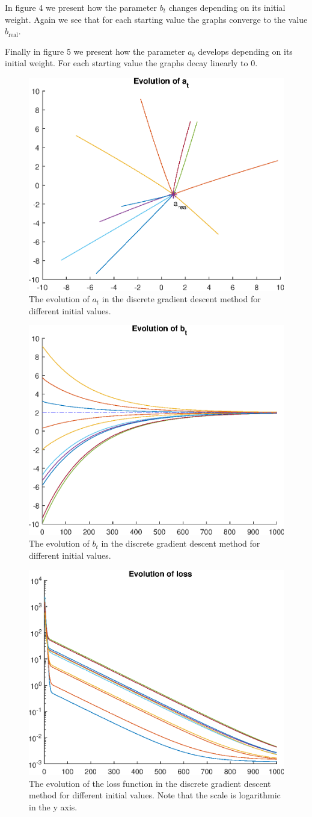 In figure 4 we
present how the parameter $ b_t $ changes depending
on its initial weight. Again we
see that for each starting value the graphs 
converge to the value $ b_{\mathrm{real}} $. \smallskip

Finally in figure 5 we
present how the parameter $ a_b $ develops depending
on its initial weight. For each starting value the graphs 
decay linearly to $ 0 $.

\begin{figure}[H]
	\centering
	\includegraphics[width=0.5\linewidth]{EvolutionA}
	\caption{The evolution of $ a_t $ in the
	discrete gradient descent method for different
	initial values.}\label{fig:exampleA}
\end{figure}

\begin{figure}[H]
	\centering
	\includegraphics[width=0.5\linewidth]{EvolutionB}
	\caption{The evolution of $ b_t $ in the
		discrete gradient descent method for different
		initial values.}\label{fig:exampleB}
\end{figure}

\begin{figure}[H]
	\centering
	\includegraphics[width=0.5\linewidth]{EvolutionLoss}
	\caption{The evolution of the loss function in the
		discrete gradient descent method for different
		initial values. Note that the scale is logarithmic
		in the y axis.}\label{fig:exampleLoss}
\end{figure}